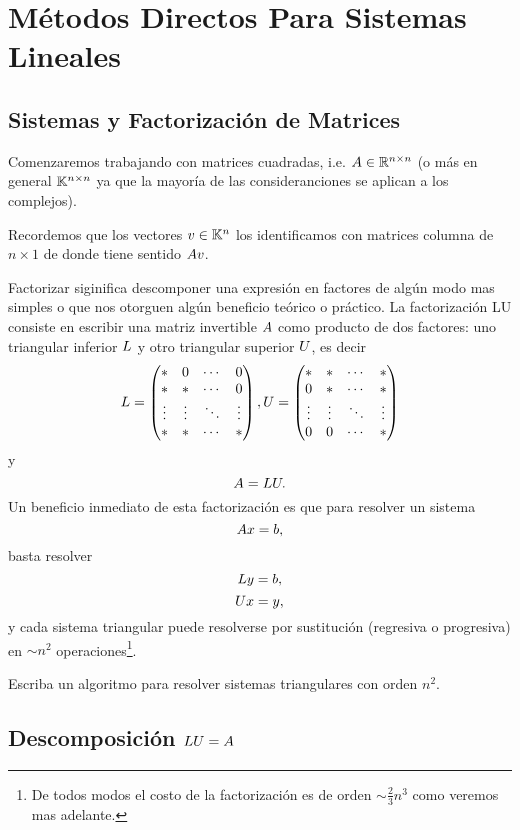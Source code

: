 
\chapter{Métodos Directos Para Sistemas Lineales}
\setcounter{equation}{0}

\section{Sistemas y Factorización de Matrices}

Comenzaremos trabajando con matrices cuadradas, i.e.  $\Ab\in \R^{n\times n}$ (o m\'as en general
$\mathbb K^{n\times n}$ ya que la mayoría de las consideranciones se aplican a los complejos).

Recordemos que los vectores $\vb\in \Kn$ los identificamos con matrices columna de $n\times 1$ de donde tiene sentido $\Ab\vb$.

Factorizar siginifica descomponer una expresión en factores de algún modo mas simples o que nos otorguen algún beneficio teórico o práctico. La factorización
LU consiste en escribir una matriz invertible $\Ab$ como producto de dos factores: uno triangular inferior $\Lb$ y otro triangular superior $\Ub$, es decir
$$
\Lb= \begin{pmatrix}
*& 0 & \cdots & 0 \\
* & * & \cdots & 0 \\
\vdots  & \vdots  & \ddots & \vdots  \\
* & * & \cdots & *
\end{pmatrix},
\Ub= \begin{pmatrix}
*& * & \cdots & * \\
0 & * & \cdots & * \\
\vdots  & \vdots  & \ddots & \vdots  \\
0 & 0 & \cdots & *
\end{pmatrix}
$$
y
$$
\Ab=\Lb\Ub.
$$
Un beneficio inmediato de esta factorización es que para  resolver un sistema
$$
\Ab\xb=\bb,
$$
basta resolver
$$
\Lb\yb=\bb,
$$
$$
\Ub\xb=\yb,
$$
y cada sistema triangular puede resolverse por sustitución (regresiva o progresiva) en $\sim n^2$ operaciones\footnote{De todos modos el costo de la factorización es de orden $\sim \frac23 n^3$ como veremos mas adelante.}.
\begin{ejercicio} Escriba  un algoritmo para resolver sistemas triangulares con orden $n^2$.
\end{ejercicio}

\section{Descomposición $\Lb\Ub=\Ab$}

